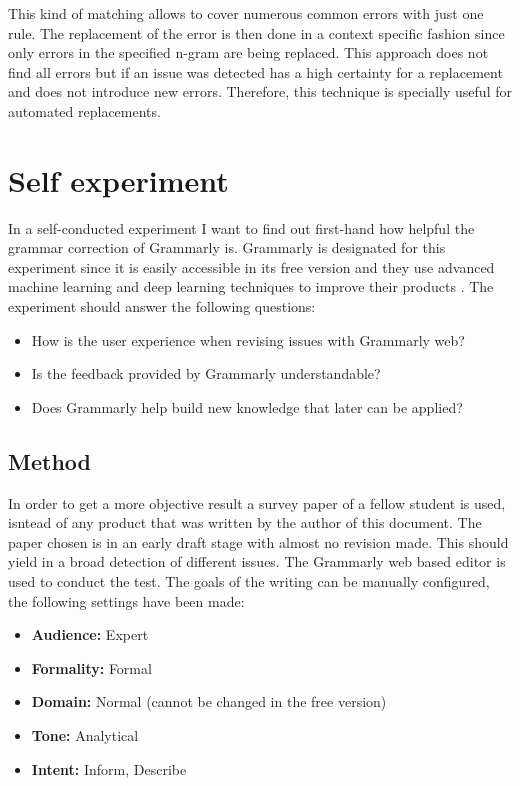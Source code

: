 \documentclass[runningheads]{llncs}
\let\OldTextregistered\textregistered
\renewcommand{\textregistered}{\OldTextregistered\xspace}%
\begin{document}
This kind of matching allows to cover numerous common errors with just one rule. The replacement of the error is then done in a context specific fashion since only errors in the specified n-gram are being replaced. This approach does not find all errors but if an issue was detected has a high certainty for a replacement and does not introduce new errors. Therefore, this technique is specially useful for automated replacements.


\section{Self experiment}
In a self-conducted experiment I want to find out first-hand how helpful the grammar correction of Grammarly\textregistered is. Grammarly\textregistered is designated for this experiment since it is easily accessible in its free version and they use advanced machine learning and deep learning techniques to improve their products \citep{noauthor_write_nodate}. The experiment should answer the following questions:

\begin{itemize}
 \item How is the user experience when revising issues with Grammarly\textregistered web?
 \item Is the feedback provided by Grammarly\textregistered understandable?
 \item Does Grammarly\textregistered help build new knowledge that later can be applied?
\end{itemize}


\subsection{Method}
In order to get a more objective result a survey paper of a fellow student is used, isntead of any product that was written by the author of this document. The paper chosen is in an early draft stage with almost no revision made. This should yield in a broad detection of different issues. The Grammarly\textregistered web based editor is used to conduct the test. The goals of the writing can be manually configured, the following settings have been made:

\begin{itemize}
 \item \textbf{Audience:} Expert
 \item \textbf{Formality:} Formal
 \item \textbf{Domain:} Normal (cannot be changed in the free version)
 \item \textbf{Tone:} Analytical
 \item \textbf{Intent:} Inform, Describe
\end{itemize}
\end{document}
